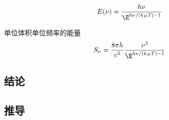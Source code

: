 

\begin{equation}
E(\nu) = \frac{h\nu}{\E^{h\nu/(k_B T) - 1}}
\end{equation}

单位体积单位频率的能量
\begin{equation}
S_\nu = \frac{8\pi h}{c^3}\frac{\nu^3}{\E^{h\nu/(k_B T) - 1}}
\end{equation}



\subsection{结论}

\subsection{推导}
